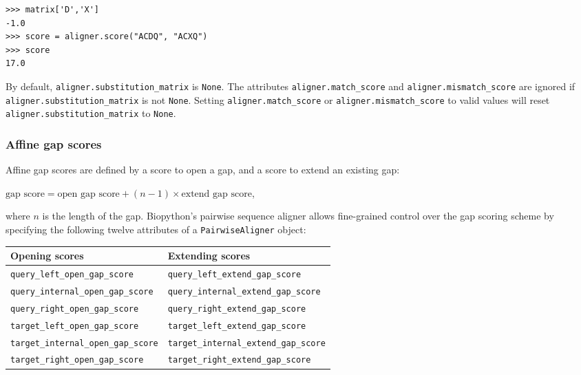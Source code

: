 \begin{itemize}
\begin{verbatim}
>>> matrix['D','X']
-1.0
>>> score = aligner.score("ACDQ", "ACXQ")
>>> score
17.0
\end{verbatim}
\end{itemize}

By default, \verb+aligner.substitution_matrix+ is \verb+None+.
The attributes \verb+aligner.match_score+ and \verb+aligner.mismatch_score+ are
ignored if \verb+aligner.substitution_matrix+ is not \verb+None+.
Setting \verb+aligner.match_score+ or \verb+aligner.mismatch_score+ to valid values will reset \verb+aligner.substitution_matrix+ to \verb+None+.
 
\subsubsection{Affine gap scores}
\label{sec:pairwise-affine-gapscores}

Affine gap scores are defined by a score to open a gap, and a score to extend
an existing gap:

$\textrm{gap score} = \textrm{open gap score} + (n-1) \times \textrm{extend gap score}$,

where $n$ is the length of the gap.
Biopython's pairwise sequence aligner allows fine-grained control over the gap
scoring scheme by specifying the following twelve attributes of a \verb+PairwiseAligner+ object:

\begin{table}[h]
\begin{tabular}{|l|l|}
\hline
\bf{Opening scores}                   & \bf{Extending scores} \\
\hline
\verb+query_left_open_gap_score+      & \verb+query_left_extend_gap_score+ \\
\verb+query_internal_open_gap_score+  & \verb+query_internal_extend_gap_score+ \\
\verb+query_right_open_gap_score+     & \verb+query_right_extend_gap_score+ \\
\verb+target_left_open_gap_score+     & \verb+target_left_extend_gap_score+ \\
\verb+target_internal_open_gap_score+ & \verb+target_internal_extend_gap_score+ \\
\verb+target_right_open_gap_score+    & \verb+target_right_extend_gap_score+ \\
\hline
\end{tabular}
\end{table}

